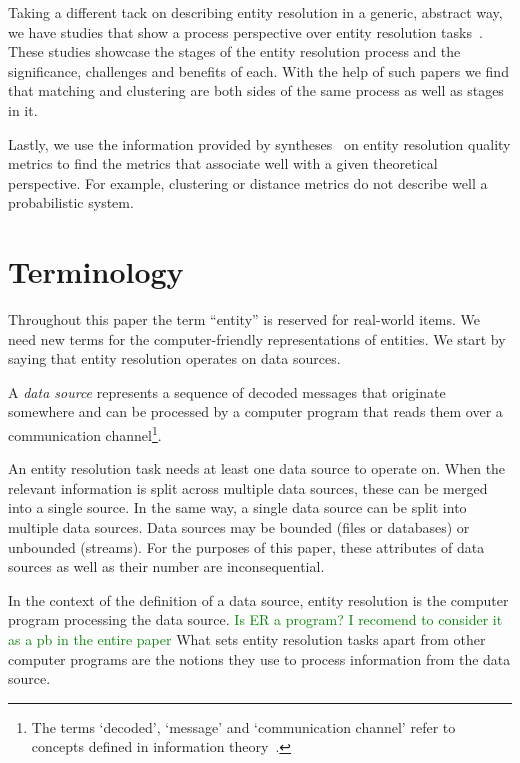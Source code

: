 \documentclass[journal]{IEEEtran}
\begin{document}
    Taking a different tack on describing entity resolution in a generic,
    abstract way, we have studies that show a process perspective over entity
    resolution tasks~\cite{Pap19,Chen09}.
    These studies showcase the stages of the entity resolution process and the
    significance, challenges and benefits of each.
    With the help of such papers we find that matching and clustering are both
    sides of the same process as well as stages in it.

    Lastly, we use the information provided by syntheses~\cite{hitesh2012} on
    entity resolution quality metrics to find the metrics that associate well
    with a given theoretical perspective.
    For example, clustering or distance metrics do not describe well a
    probabilistic system.

    \section{Terminology}\label{sec:terminology}

    Throughout this paper the term ``entity'' is reserved for real-world items.
    We need new terms for the computer-friendly representations of entities.
    We start by saying that entity resolution operates on data sources.

    \begin{defn}
        A \textit{data source} represents a sequence of decoded messages
        that originate somewhere and can be processed by a computer program that
        reads them over a communication channel\footnote{The terms `decoded', `message' and `communication channel' refer to concepts
        defined in information theory~\cite{ash2012it}.}.
    \end{defn}

    
    
    An entity resolution task needs at least one data source to operate on.
    When the relevant information is split across multiple data sources, these
    can be merged into a single source.
    In the same way, a single data source can be split into multiple data
    sources.
    Data sources may be bounded (files or databases) or unbounded (streams).
    For the purposes of this paper, these attributes of data sources as well as
    their number are inconsequential.
    
    In the context of the definition of a data source, entity resolution is the
    computer program processing the data source.
    \textcolor{green}{Is ER a program? I recomend to consider it as a pb in the entire paper} 
    What sets entity resolution tasks apart from other computer programs are the
    notions they use to process information from the data source.
\end{document}
